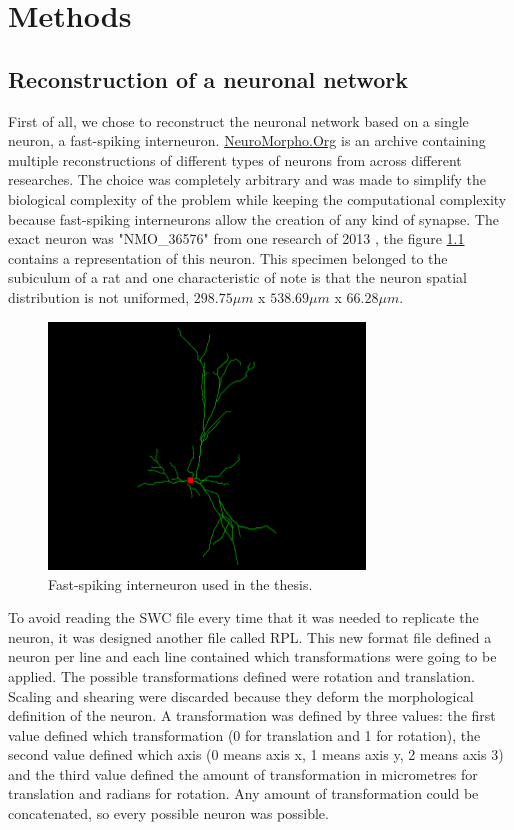 \chapter{Methods}
\label{chapter:methods}

\section{Reconstruction of a neuronal network}
\label{reconstruction}
First of all, we chose to reconstruct the neuronal network based on a single neuron, a fast-spiking interneuron. \href{https://neuromorpho.org/}{NeuroMorpho.Org} \cite{Neuromorpho1,Neuromorpho2} is an archive containing multiple reconstructions of different types of neurons from across different researches. The choice was completely arbitrary and was made to simplify the biological complexity of the problem while keeping the computational complexity because fast-spiking interneurons allow the creation of any kind of synapse. The exact neuron was "NMO\_36576" from one research of 2013 \cite{interneuron}, the figure \ref{fig:interneuron} contains a representation of this neuron. This specimen belonged to the subiculum of a rat and one characteristic of note is that the neuron spatial distribution is not uniformed, $298.75 \mu m$ x $538.69 \mu m$ x $66.28 \mu m$.
\begin{figure}[h!]
    \centering
    \includegraphics[width=0.75\textwidth]{figures/interneuron.png}
    \caption{Fast-spiking interneuron used in the thesis.}
    \label{fig:interneuron}
\end{figure}

To avoid reading the SWC file every time that it was needed to replicate the neuron, it was designed another file called RPL. This new format file defined a neuron per line and each line contained which transformations were going to be applied. The possible transformations defined were rotation and translation. Scaling and shearing were discarded because they deform the morphological definition of the neuron. A transformation was defined by three values: the first value defined which transformation (0 for translation and 1 for rotation), the second value defined which axis (0 means axis x, 1 means axis y, 2 means axis 3) and the third value defined the amount of transformation in micrometres for translation and radians for rotation. Any amount of transformation could be concatenated, so every possible neuron was possible.

